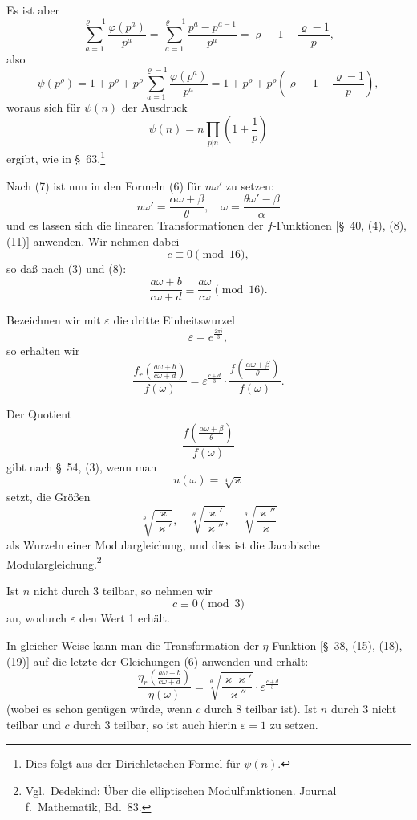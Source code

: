 \documentclass[12pt,a4paper]{article}
\theoremstyle{definition}
\begin{document}
Es ist aber
\[
\sum_{a=1}^{\varrho-1} \frac{\varphi(p^a)}{p^a} = \sum_{a=1}^{\varrho-1} \frac{p^a - p^{a-1}}{p^a} = \varrho - 1 - \frac{\varrho - 1}{p},
\]
also
\[
\psi(p^\varrho) = 1 + p^\varrho + p^\varrho \sum_{a=1}^{\varrho-1} \frac{\varphi(p^a)}{p^a} = 1 + p^\varrho + p^\varrho \left(\varrho - 1 - \frac{\varrho - 1}{p}\right),
\]
woraus sich für $\psi(n)$ der Ausdruck
\[
\psi(n) = n \prod_{p|n} \left(1 + \frac{1}{p}\right)
\]
ergibt, wie in \S\ 63.\footnote{Dies folgt aus der Dirichletschen Formel für $\psi(n)$.}

Nach (7) ist nun in den Formeln (6) für $n\omega'$ zu setzen:
\[
n\omega' = \frac{\alpha\omega + \beta}{\theta}, \quad \omega = \frac{\theta\omega' - \beta}{\alpha}
\]
und es lassen sich die linearen Transformationen der $f$-Funktionen [\S\ 40, (4), (8), (11)] anwenden. Wir nehmen dabei
\begin{equation}\label{eq:68-12}
c \equiv 0 \pmod{16},
\end{equation}
so daß nach (3) und (8):
\[
\frac{a\omega + b}{c\omega + d} \equiv \frac{a\omega}{c\omega} \pmod{16}.
\]

Bezeichnen wir mit $\varepsilon$ die dritte Einheitswurzel
\begin{equation}\label{eq:68-13}
\varepsilon = e^{\frac{2\pi i}{3}},
\end{equation}
so erhalten wir
\[
\frac{f_r(\frac{a\omega + b}{c\omega + d})}{f(\omega)} = \varepsilon^{\frac{c + d}{3}} \cdot \frac{f(\frac{\alpha\omega + \beta}{\theta})}{f(\omega)}.
\]

Der Quotient
\[
\frac{f(\frac{\alpha\omega + \beta}{\theta})}{f(\omega)}
\]
gibt nach \S\ 54, (3), wenn man
\[
u(\omega) = \sqrt[4]{\varkappa}
\]
setzt, die Größen
\[
\sqrt[\theta]{\frac{\varkappa}{\varkappa'}}, \quad \sqrt[\theta]{\frac{\varkappa'}{\varkappa''}}, \quad \sqrt[\theta]{\frac{\varkappa''}{\varkappa}}
\]
als Wurzeln einer Modulargleichung, und dies ist die Jacobische Modulargleichung.\footnote{Vgl.\ Dedekind: \"Uber die elliptischen Modulfunktionen. Journal f.\ Mathematik, Bd.~83.}


Ist $n$ nicht durch 3 teilbar, so nehmen wir
\begin{equation}\label{eq:68-17}
c \equiv 0 \pmod{3}
\end{equation}
an, wodurch $\varepsilon$ den Wert 1 erhält.

In gleicher Weise kann man die Transformation der $\eta$-Funktion [\S\ 38, (15), (18), (19)] auf die letzte der Gleichungen (6) anwenden und erhält:
\begin{equation}\label{eq:68-18}
\frac{\eta_r(\frac{a\omega + b}{c\omega + d})}{\eta(\omega)} = \sqrt[\theta]{\frac{\varkappa\varkappa'}{\varkappa''}} \cdot \varepsilon^{\frac{c + d}{3}}
\end{equation}
(wobei es schon genügen würde, wenn $c$ durch 8 teilbar ist). Ist $n$ durch 3 nicht teilbar und $c$ durch 3 teilbar, so ist auch hierin $\varepsilon = 1$ zu setzen.
\end{document}

